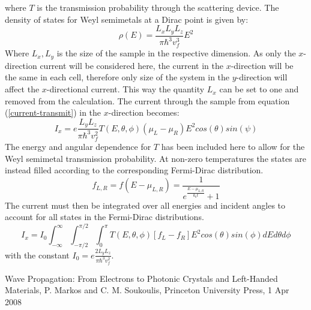 \documentclass[12pt,a4paper]{article}
\begin{document}
			where $T$ is the transmission probability through the scattering device. The density of states for Weyl semimetals at a Dirac point is given by:
			\begin{equation}
				\rho\left(E\right)=\frac{L_{x}L_{y}L_{z}}{\pi\hbar^{3}v_{f}^{3}}E^{2}
				\label{weyl-dos}
			\end{equation}
			Where  $L_{x}, L_{y}$ is the size of the sample in the respective dimension. As only the $x$-direction current will be considered here, the current in the $x$-direction will be the same in each cell, therefore only size of the system in the $y$-direction will affect the $x$-directional current. This way the quantity $L_{x}$ can be set to one and removed from the calculation. The current through the sample from equation (\ref{current-transmit}) in the $x$-direction becomes:
			\begin{equation}
				I_{x}=e\frac{L_{y}L_{z}}{\pi\hbar^{3}v_{f}^{2}}T\left(E,\theta, \phi\right)\left(\mu_{L}-\mu_{R}\right)E^{2}cos\left(\theta\right)sin\left(\psi\right)
			\end{equation}
			The energy and angular dependence for $T$ has been included here to allow for the Weyl semimetal transmission probability. At non-zero temperatures the states are instead filled according to the corresponding Fermi-Dirac distribution.
			\begin{equation}
				f_{L,R}=f\left(E-\mu_{L,R}\right)=\frac{1}{e^{\frac{E-\mu_{L,R}}{k_{b}t}}+1}
			\end{equation}
			The current must then be integrated over all energies and incident angles to account for all states in the Fermi-Dirac distributions.
			\begin{equation}
				I_{x}=I_{0}\int^{\infty}_{-\infty}\int^{\pi/2}_{-\pi/2}\int^{\pi}_{0}T\left(E,\theta, \phi\right)\left[f_{L}-f_{R}\right]E^{2}cos\left(\theta\right)sin\left(\phi\right)dEd\theta d\phi
			\end{equation}
			with the constant $I_{0}=e\frac{2L_{y}L_{z}}{\pi\hbar^{3}v_{f}^{2}}$. 

\begin{thebibliography}{10}

Wave Propagation: From Electrons to Photonic Crystals and Left-Handed Materials,
P. Markos and C. M. Soukoulis,
\newblock Princeton University Press, 1 Apr 2008

\end{thebibliography}
\end{document}
